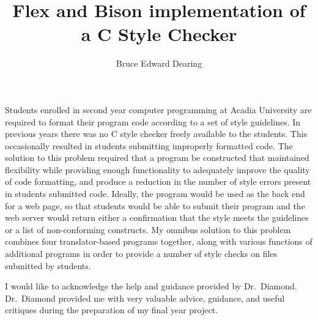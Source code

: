 

\title{Flex and Bison implementation of a C Style Checker}
\author{Bruce Edward Dearing}

\beforepreface
{}

\medskip

Students enrolled in second year computer programming at Acadia 
University are required to format their program code according to a set of 
style guidelines. In previous years there was no C style checker freely 
available to the students. This occasionally resulted in students submitting 
improperly formatted code. The solution to this problem required that a program 
be constructed that maintained flexibility while providing enough functionality
to adequately improve the quality of code formatting, and produce a reduction 
in the number of style errors present in students submitted code. Ideally, 
the program would be used as the back end for a web page, so that students
would be able to submit their program and the web server would return either 
a confirmation that the style meets the guidelines or a list of non-conforming 
constructs. My omnibus solution to this problem combines four translator-based
programs together, along with various functions of additional programs in order 
to provide a number of style checks on files submitted by students.
\newpage
    

I would like to acknowledge the help and guidance provided by Dr.~Diamond.\\
Dr.~Diamond provided me with very valuable advice, guidance, and useful 
critiques during the preparation of my final year project.
\afterpreface
